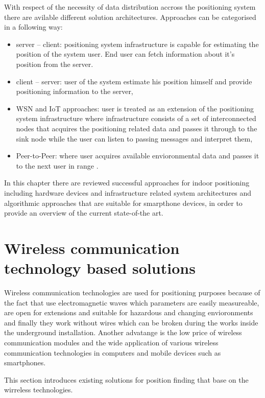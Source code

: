 \documentclass[../main.tex]{subfiles}
\begin{document}
With respect of the necessity of data distribution accross the positioning system there are avilable different solution architectures. Approaches can be categorised in a following way:
\begin{itemize}
	\item server -- client: positioning system infrastructure is capable for estimating the position of the system user. End user can fetch information about it's position from the server.
	\item client -- server: user of the system estimate his position himself and provide positioning information to the server,
	\item WSN and IoT approaches: user is treated as an extension of the positioning system infrastructure where infrastructure consists of a set of interconnected nodes that acquires the positioning related data and passes it through to the sink node while the user can listen to passing messages and interpret them,
	\item Peer-to-Peer: where user acquires available envioronmental data and passes it to the next user in range \cite{article_p2p_network_tracking_rfid}.
\end{itemize}

In this chapter there are reviewed successful approaches for indoor positioning including hardware devices and infrastructure related system architectures and algorithmic approaches that are suitable for smarpthone devices, in order to provide an overview of the current state-of-the art.

\section{Wireless communication technology based solutions}
\label{sec:wireless_comm_tech_solutions}

Wireless communication technologies are used for positioning purposes because of the fact that use electromagnetic waves which parameters are easily measureable, are open for extensions and suitable for hazardous and changing envioronments and finally they work without wires which can be broken during the works inside the underground installation. Another advatange is the low price of wireless communication modules and the wide application of various wireless communication technologies in computers and mobile devices such as smartphones.

This section introduces existing solutions for position finding that base on the wirreless technologies.
\end{document}
